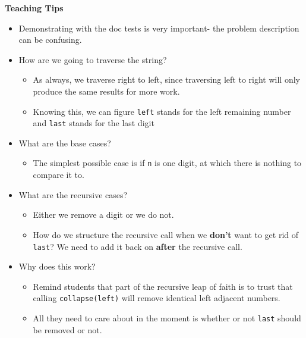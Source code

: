 \begin{blocksection}
\begin{guide}
\textbf{Teaching Tips}
\begin{itemize}
  \item Demonstrating with the doc tests is very important- the problem description can be confusing.
  \item How are we going to traverse the string?
  \begin{itemize}
    \item As always, we traverse right to left, since traversing left to right will only produce the same results for more work.
    \item Knowing this, we can figure \lstinline{left} stands for the left remaining number and \lstinline{last} stands for the last digit
  \end{itemize}
  \item What are the base cases?
  \begin{itemize}
    \item The simplest possible case is if \lstinline{n} is one digit, at which there is nothing to compare it to.
  \end{itemize}
  \item What are the recursive cases?
  \begin{itemize}
    \item Either we remove a digit or we do not.
    \item How do we structure the recursive call when we \textbf{don't} want to get rid of \lstinline{last}? We need to add it back on \textbf{after} the recursive call.
  \end{itemize}
  \item Why does this work?
  \begin{itemize}
    \item Remind students that part of the recursive leap of faith is to trust that calling \lstinline{collapse(left)} will remove identical left adjacent numbers.
    \item All they need to care about in the moment is whether or not \lstinline{last} should be removed or not.
  \end{itemize}
\end{itemize}
\end{guide}
\end{blocksection}
